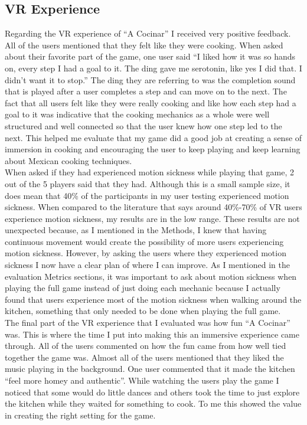 \documentclass[10pt,twocolumn]{article}
\begin{document}
\subsection{VR Experience}
Regarding the VR experience of “A Cocinar” I received very positive feedback. All of the users mentioned that they felt like they were cooking. When asked about their favorite part of the game, one user said “I liked how it was so hands on, every step I had a goal to it. The ding gave me serotonin, like yes I did that. I didn’t want it to stop.” The ding they are referring to was the completion sound that is played after a user completes a step and can move on to the next. The fact that all users felt like they were really cooking and like how each step had a goal to it was indicative that the cooking mechanics as a whole were well structured and well connected so that the user knew how one step led to the next. This helped me evaluate that my game did a good job at creating a sense of immersion in cooking and encouraging the user to keep playing and keep learning about Mexican cooking techniques. 
\\
When asked if they had experienced motion sickness while playing that game, 2 out of the 5 players said that they had. Although this is a small sample size, it does mean that 40\% of the participants in my user testing experienced motion sickness. When compared to the literature that says around 40\%-70\% of VR users experience motion sickness, my results are in the low range. These results are not unexpected because, as I mentioned in the Methods, I knew that having continuous movement would create the possibility of more users experiencing motion sickness. However, by asking the users where they experienced motion sickness I now have a clear plan of where I can improve. As I mentioned in the evaluation Metrics sections, it was important to ask about motion sickness when playing the full game instead of just doing each mechanic because I actually found that users experience most of the motion sickness when walking around the kitchen, something that only needed to be done when playing the full game. 
 \\
The final part of the VR experience that I evaluated was how fun “A Cocinar” was. This is where the time I put into making this an immersive experience came through. All of the users commented on how the fun came from how well tied together the game was. Almost all of the users mentioned that they liked the music playing in the background. One user commented that it made the kitchen “feel more homey and authentic”. While watching the users play the game I noticed that some would do little dances and others took the time to just explore the kitchen while they waited for something to cook. To me this showed the value in creating the right setting for the game.
\end{document}
